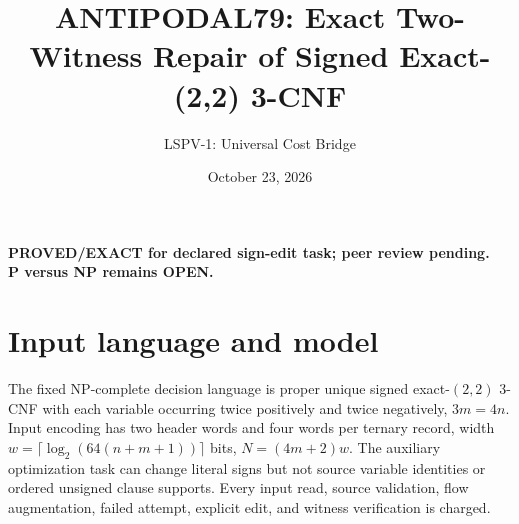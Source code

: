 \documentclass[11pt]{article}
\title{ANTIPODAL79: Exact Two-Witness Repair of Signed Exact-(2,2) 3-CNF}
\author{LSPV-1: Universal Cost Bridge}
\date{October 23, 2026}
\begin{document}
\maketitle
\begin{center}\textbf{PROVED/EXACT for declared sign-edit task; peer review pending.}\\
\textbf{P versus NP remains OPEN.}\end{center}
\section{Input language and model}
The fixed NP-complete decision language is proper unique signed exact-$(2,2)$ 3-CNF with each variable occurring twice positively and twice negatively, $3m=4n$. Input encoding has two header words and four words per ternary record, width $w=\lceil\log_2(64(n+m+1))\rceil$ bits, $N=(4m+2)w$. The auxiliary optimization task can change literal signs but not source variable identities or ordered unsigned clause supports. Every input read, source validation, flow augmentation, failed attempt, explicit edit, and witness verification is charged.
\end{document}

